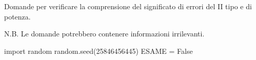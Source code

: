 \documentclass[11pt,twoside,a4paper]{article}
\def\Pr{{\rm Pr\,}}
\newcounter{quesito}
\newenvironment{question}{\bigskip\addtocounter{quesito}{1}\par\textbf{Quesito \thequesito.\kern1ex}}{\vspace{\parskip}}
\newenvironment{answer}{\par\textbf{Risposta\quad}}{\vspace{\parskip}}
\begin{document}
\colorbox{blue!10}{\begin{minipage}{\textwidth}
Domande per verificare la comprensione del significato di errori del II tipo e di potenza.\bigskip

N.B. Le domande potrebbero contenere informazioni irrilevanti.
\end{minipage}}

\bigskip\bigskip

\begin{pycode}
import random
random.seed(25846456445)
ESAME = False
\end{pycode}

% 
% 
% 
% 
% 
% 
% 
% 
% 
% 
\end{document}
